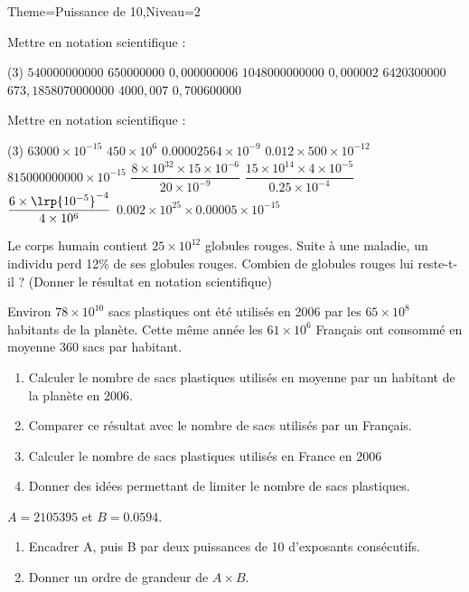 \documentclass[a4paper,12pt]{article}
\begin{document}
\begin{Maquette}[Fiche]{Theme=Puissance de 10,Niveau=2}
\begin{exercice}
Mettre en notation scientifique :
\begin{tasks}(3)
\task $540 000 000 000$
\task $650 000 000$
\task $0,000 000 006$
\task $1 048 000 000 000$
\task $0,000 002$
\task $64 20 300 000$
\task $673,185 8 070 000 000$
\task $4000,007$
\task $0,700 600 000$
\end{tasks}
\end{exercice}
\begin{exercice}
Mettre en notation scientifique :
\begin{tasks}(3)
\task $63000\times 10^{-15} $
\task $450\times 10^{6} $
\task $0.00002564\times 10^{-9}$
\task $0.012\times 500\times 10^{-12} $
\task $815000000000\times 10^{-15} $
\task $\dfrac{8\times 10^{32}\times 15\times 10^{-6}}{20\times 10^{-9}} $
\task $\dfrac{15\times 10^{14}\times 4\times 10^{-5}}{0.25\times 10^{-4}} $
\task $\dfrac{6\times \lrp{10^{-5}}^{-4}}{4\times 10^{6}} $
\task $0.002\times 10^{25}\times 0.00005\times 10^{-15} $
\end{tasks}
\end{exercice}

\begin{exercice}
Le corps humain contient $25\times 10^{12}$ globules rouges. Suite à une maladie,
un individu perd 12\% de ses globules rouges. Combien de globules rouges lui reste-t-il ?
(Donner le résultat en notation scientifique)
\end{exercice}

\begin{exercice}
Environ $78\times 10^{10} $ sacs plastiques ont été utilisés en 2006 par les $ 65\times 10^{8}$
 habitants de la planète. Cette même année les $61\times 10^{6} $ Français ont consommé en moyenne 360 sacs par habitant.
 \begin{enumerate}
 \item Calculer le nombre de sacs plastiques utilisés en moyenne par un habitant de la planète en 2006.
 \item Comparer ce résultat avec le nombre de sacs utilisés par un Français.
 \item Calculer le nombre de sacs plastiques utilisés en France en 2006
 \item Donner des idées permettant de limiter le nombre de sacs plastiques.
 \end{enumerate}
\end{exercice}

\begin{exercice}
$A =2105395$ et $B =0.0594$.
\begin{enumerate}
\item Encadrer A, puis B par deux puissances de 10 d'exposants consécutifs.
\item Donner un ordre de grandeur de $A\times B$.
\end{enumerate}
\end{exercice}



\end{Maquette}
\end{document}
